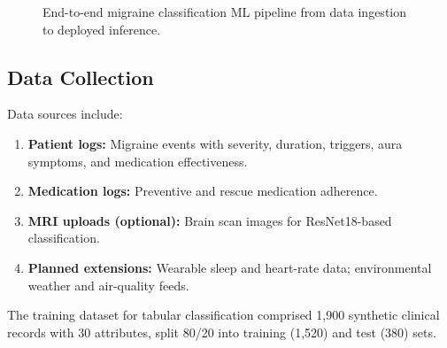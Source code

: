\documentclass[conference,twocolumn,letterpaper]{IEEEtran}
\begin{document}
\begin{figure}[t]
\centering
{}
\caption{End-to-end migraine classification ML pipeline from data ingestion to deployed inference.}
\label{fig:ml_pipeline}
\end{figure}

\subsection{Data Collection}
Data sources include:
\begin{enumerate}
    \item \textbf{Patient logs:} Migraine events with severity, duration, triggers, aura symptoms, and medication effectiveness.
    \item \textbf{Medication logs:} Preventive and rescue medication adherence.
    \item \textbf{MRI uploads (optional):} Brain scan images for ResNet18-based classification.
    \item \textbf{Planned extensions:} Wearable sleep and heart-rate data; environmental weather and air-quality feeds.
\end{enumerate}
The training dataset for tabular classification comprised 1,900 synthetic clinical records with 30 attributes, split 80/20 into training (1,520) and test (380) sets.
\end{document}
